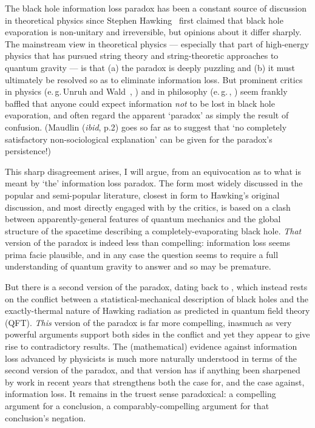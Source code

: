 \documentclass[12pt]{article}
\newcommand{\egc}{\mbox{e.\,g.\,}}
\begin{document}
The black hole information loss paradox has been a constant source of discussion in theoretical physics since Stephen Hawking~\citeyear{hawkingbreakdown} first claimed that black hole evaporation is non-unitary and irreversible, but opinions about it differ sharply. The mainstream view in theoretical physics --- especially that part of high-energy physics that has pursued string theory and string-theoretic approaches to quantum gravity --- is that (a) the paradox is deeply puzzling and (b) it must ultimately be resolved so as to eliminate information loss. But prominent critics in physics (\egc Unruh and Wald~\citeyear{unruhwaldpuremixed,unruhwaldinformation}, ) and in philosophy (\egc {}, ) seem frankly baffled that anyone could expect information \emph{not} to be lost in black hole evaporation, and often regard the apparent `paradox' as simply the result of confusion. (Maudlin (\emph{ibid}, p.2) goes so far as to suggest that `no completely satisfactory non-sociological explanation' can be given for the paradox's persistence!)

This sharp disagreement arises, I will argue, from an equivocation as to what is meant by `the' information loss paradox. The form most widely discussed in the popular and semi-popular literature, closest in form to Hawking's original discussion, and most directly engaged with by the critics, is based on a clash between apparently-general features of quantum mechanics and the global structure of the spacetime describing a completely-evaporating black hole. \emph{That} version of the paradox is indeed less than compelling: information loss seems prima facie plausible, and in any case the question seems to require a full understanding of quantum gravity to answer and so may be premature.

But there is a second version of the paradox, dating back to , which instead rests on the conflict between a statistical-mechanical description of black holes and the exactly-thermal nature of Hawking radiation as predicted in quantum field theory (QFT). \emph{This} version of the paradox is far more compelling, inasmuch as very powerful arguments support both sides in the conflict and yet they appear to give rise to contradictory results. The (mathematical) evidence against information loss advanced by physicists is much more naturally understood in terms of the second version of the paradox, and that version has if anything been sharpened by work in recent years that strengthens both the case for, and the case against, information loss. It remains in the truest sense paradoxical: a compelling argument for a conclusion, a comparably-compelling argument for that conclusion's negation.
\end{document}
